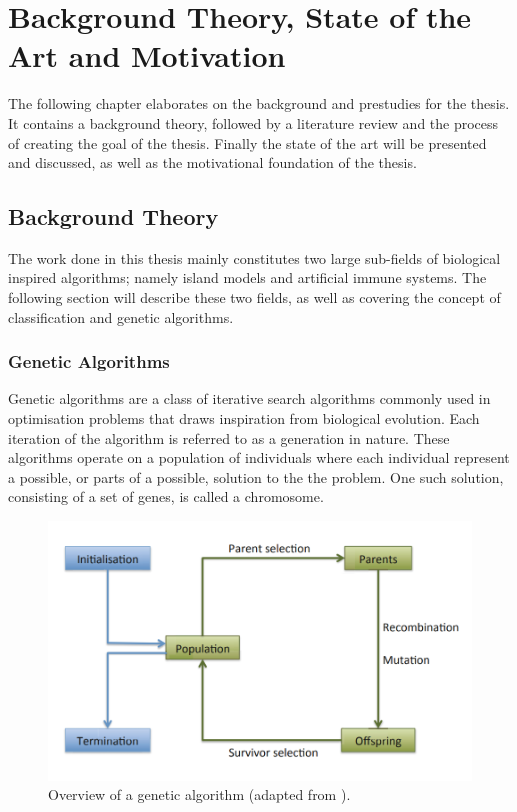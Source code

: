 \chapter{Background Theory, State of the Art and Motivation}\label{T-B}
\label{cha:TheoryAndBackground}
The following chapter elaborates on the background and prestudies for the thesis. It contains a background theory, followed by a literature review and the process of creating the goal of the thesis. Finally the state of the art will be presented and discussed, as well as the motivational foundation of the thesis. 

\section{Background Theory}
The work done in this thesis mainly constitutes two large sub-fields of biological inspired algorithms; namely island models and artificial immune systems. The following section will describe these two fields, as well as covering the concept of classification and genetic algorithms. 

\subsection{Genetic Algorithms}
\label{sec:GA}
Genetic algorithms are a class of iterative search algorithms commonly used in optimisation problems that draws inspiration from biological evolution. Each iteration of the algorithm is referred to as a generation in nature. These algorithms operate on a population of individuals where each individual represent a possible, or parts of a possible, solution to the the problem. One such solution, consisting of a set of genes, is called a chromosome. 

\begin{figure}
    \centering
    \includegraphics[width=1.0\columnwidth]{figs/GAoverview.PNG}
    \caption[Overview of a genetic algorithm]
    {Overview of a genetic algorithm (adapted from \cite{IntroToEvolutionaryComputing}).}
    \label{fig:GA-overview}
\end{figure}

